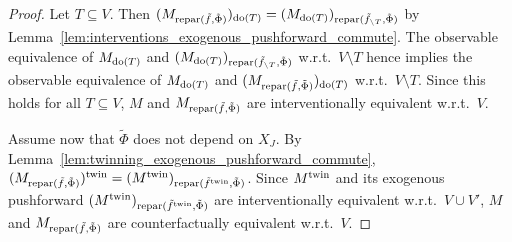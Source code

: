 \begin{proof}
  Let $T \subseteq V$. 
  Then $(M_{\mathrm{repar}({\tilde{f}},{\tilde{\Phi}})})_{\operatorname{do}(T)} = (M_{\operatorname{do}(T)})_{\mathrm{repar}({\tilde{f}_{\setminus T}},{\tilde{\Phi}})}$ by Lemma~\ref{lem:interventions_exogenous_pushforward_commute}.
  The observable equivalence of $M_{\operatorname{do}(T)}$ and $(M_{\operatorname{do}(T)})_{\mathrm{repar}({\tilde{f}_{\setminus T}},{\tilde{\Phi}})}$ w.r.t.\ $V \setminus T$ hence implies the observable equivalence of $M_{\operatorname{do}(T)}$ and $(M_{\mathrm{repar}({\tilde{f}},{\tilde{\Phi}})})_{\operatorname{do}(T)}$ w.r.t.\ $V \setminus T$.
  Since this holds for all $T \subseteq V$, $M$ and $M_{\mathrm{repar}({\tilde{f}},{\tilde{\Phi}})}$ are interventionally equivalent w.r.t.\ $V$.

  Assume now that $\tilde{\Phi}$ does not depend on $X_J$. By Lemma~\ref{lem:twinning_exogenous_pushforward_commute}, $(M_{\mathrm{repar}({\tilde{f}},{\tilde{\Phi}})})^{\mathrm{twin}} = (M^{\mathrm{twin}})_{\mathrm{repar}({\tilde{f}^{\mathrm{twin}}},{\tilde{\Phi}})}$.
  Since $M^{\mathrm{twin}}$ and its exogenous pushforward $(M^{\mathrm{twin}})_{\mathrm{repar}({\tilde{f}^{\mathrm{twin}}},{\tilde{\Phi}})}$ are interventionally equivalent w.r.t.\ $V \cup V'$, $M$ and $M_{\mathrm{repar}({\tilde{f}},{\tilde{\Phi}})}$ are counterfactually equivalent w.r.t.\ $V$.
\end{proof}

